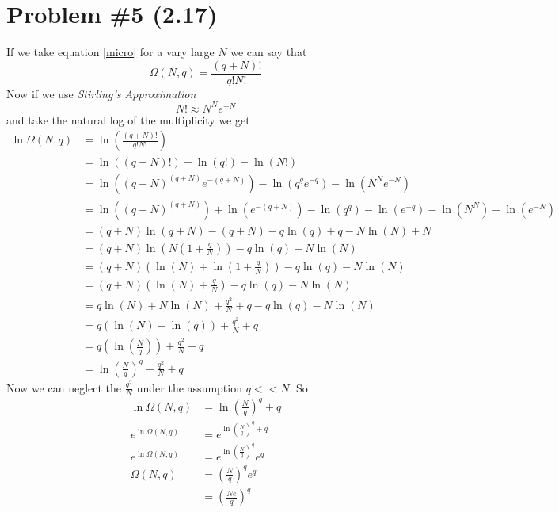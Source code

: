 \documentclass[11pt]{article}
\numberwithin{equation}{section}
\begin{document}
\section{Problem \#5 (2.17)}
If we take equation \ref{micro} for a vary large $N$ we can say that
$$\Omega(N,q) = \frac{(q+N)!}{q!N!}$$
Now if we use \emph{Stirling's Approximation}
\begin{equation}
N! \approx N^Ne^{-N}
\label{Stir}
\end{equation}
and take the natural log of the multiplicity we get
\begin{align*}
\ln\Omega(N,q) &= \ln\left(\frac{(q+N)!}{q!N!}\right)\\
&= \ln((q+N)!) - \ln(q!) -\ln(N!)\\
&= \ln((q+N)^{(q+N)}e^{-(q+N)}) - \ln(q^qe^{-q}) -\ln(N^Ne^{-N})\\
&= \ln((q+N)^{(q+N)}) + \ln(e^{-(q+N)}) - \ln(q^q) - \ln(e^{-q}) - \ln(N^N) - \ln(e^{-N})\\
&= (q+N)\ln(q+N) - (q+N) - q\ln(q) + q - N\ln(N) + N \\
&= (q+N)\ln\left(N\left(1+\frac{q}{N}\right)\right) - q\ln(q) - N\ln(N) \\
&= (q+N)\left(\ln(N)+ \ln\left(1+\frac{q}{N}\right)\right) - q\ln(q) - N\ln(N) \\
&= (q+N)\left(\ln(N) + \frac{q}{N}\right) - q\ln(q) - N\ln(N) \\
&= q\ln(N) + N\ln(N) + \frac{q^2}{N} + q - q\ln(q) - N\ln(N) \\
&= q(\ln(N) - \ln(q))  + \frac{q^2}{N} + q \\
&= q\left(\ln\left(\frac{N}{q}\right)\right)  + \frac{q^2}{N} + q \\
&= \ln\left(\frac{N}{q}\right)^q  + \frac{q^2}{N} + q 
\end{align*}
Now we can neglect the $\frac{q^2}{N}$ under the assumption $q<<N$. So
\begin{align*}
\ln\Omega(N,q) &=  \ln\left(\frac{N}{q}\right)^q  + q \\
e^{\ln\Omega(N,q)} &=  e^{\ln\left(\frac{N}{q}\right)^q  + q} \\
e^{\ln\Omega(N,q)} &=  e^{\ln\left(\frac{N}{q}\right)^q}e^{q} \\
\Omega(N,q) &=  \left(\frac{N}{q}\right)^qe^{q} \\
&=  \left(\frac{Ne}{q}\right)^q
\end{align*}
\end{document}
